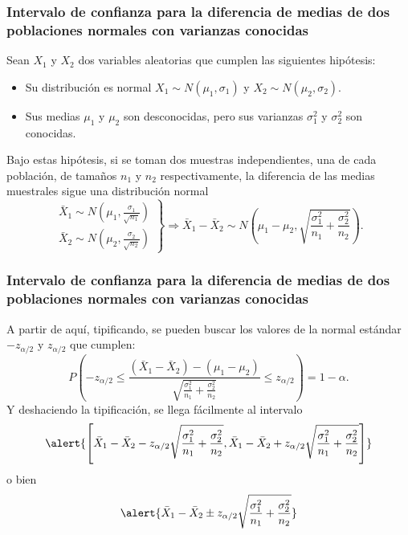 \begin{frame}
\frametitle{Intervalo de confianza para la diferencia de medias de dos poblaciones normales con varianzas conocidas}
Sean $X_1$ y $X_2$ dos variables aleatorias que cumplen las siguientes hipótesis:
\begin{itemize}
\item Su distribución es normal $X_1\sim N(\mu_1,\sigma_1)$ y $X_2\sim N(\mu_2,\sigma_2)$.
\item Sus medias $\mu_1$ y $\mu_2$ son desconocidas, pero sus varianzas $\sigma^2_1$ y $\sigma^2_2$ son conocidas.
\end{itemize}
Bajo estas hipótesis, si se toman dos muestras independientes, una de cada población, de tamaños $n_1$ y $n_2$ respectivamente, la diferencia de las medias muestrales sigue una distribución normal
\[
\left.
\begin{array}{l}
\bar{X}_1\sim N\left(\mu_1,\frac{\sigma_1}{\sqrt{n_1}} \right)\\
\bar{X}_2\sim N\left(\mu_2,\frac{\sigma_2}{\sqrt{n_2}} \right)
\end{array}
\right\}
\Rightarrow
\bar{X}_1-\bar{X}_2 \sim N\left(\mu_1-\mu_2,\sqrt{\frac{\sigma^2_1}{n_1}+\frac{\sigma^2_2}{n_2}}\right).
\]
\end{frame}


\begin{frame}
\frametitle{Intervalo de confianza para la diferencia de medias de dos poblaciones normales con varianzas conocidas}
A partir de aquí, tipificando, se pueden buscar los valores de la normal estándar $-z_{\alpha/2}$ y $z_{\alpha/2}$ que cumplen:
\[
P\left(-z_{\alpha/2}\leq \frac{(\bar{X}_1-\bar{X}_2)-(\mu_1-\mu_2)}{\sqrt{\frac{\sigma^2_1}{n_1}+\frac{\sigma^2_2}{n_2}}} \leq z_{\alpha/2}\right) = 1-\alpha.
\]
Y deshaciendo la tipificación, se llega fácilmente al intervalo
\[
\alert{\left[\bar{X}_1-\bar{X}_2-z_{\alpha/2}\sqrt{\frac{\sigma^2_1}{n_1}+\frac{\sigma^2_2}{n_2}},\bar{X}_1-\bar{X}_2+z_{\alpha/2}\sqrt{\frac{\sigma^2_1}{n_1}+\frac{\sigma^2_2}{n_2}}\right]}
\]
o bien
\[
\alert{\bar{X}_1-\bar{X}_2\pm z_{\alpha/2}\sqrt{\frac{\sigma^2_1}{n_1}+\frac{\sigma^2_2}{n_2}}}
\]
\end{frame}



